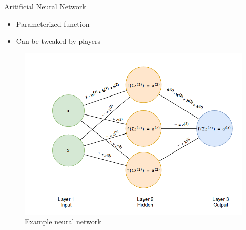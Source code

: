 \documentclass{IFES-beamer}
\begin{document}
        \begin{frame}{Aritificial Neural Network}
            \begin{itemize}
                \item Parameterized function
                \item Can be tweaked by players
            \end{itemize}
            \begin{figure}[H]
                \centering
                \includegraphics[scale=0.15]{Images/nn_diagram_1.png}
                \caption{Example neural network}
            \end{figure}
        \end{frame}
\end{document}
